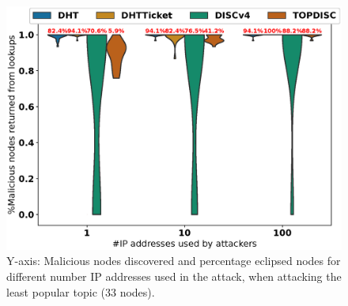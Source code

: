 \begin{figure}[!h]
\includegraphics[width=\linewidth]{results/security/violin_sybilSize_percentageMaliciousDiscovered_t299.eps}
\caption{Y-axis: Malicious nodes discovered and percentage eclipsed nodes for different number IP addresses used in the attack,  when attacking the least popular topic (33 nodes).}
\label{fig:eclipse_sybil_t299}
\end{figure}



